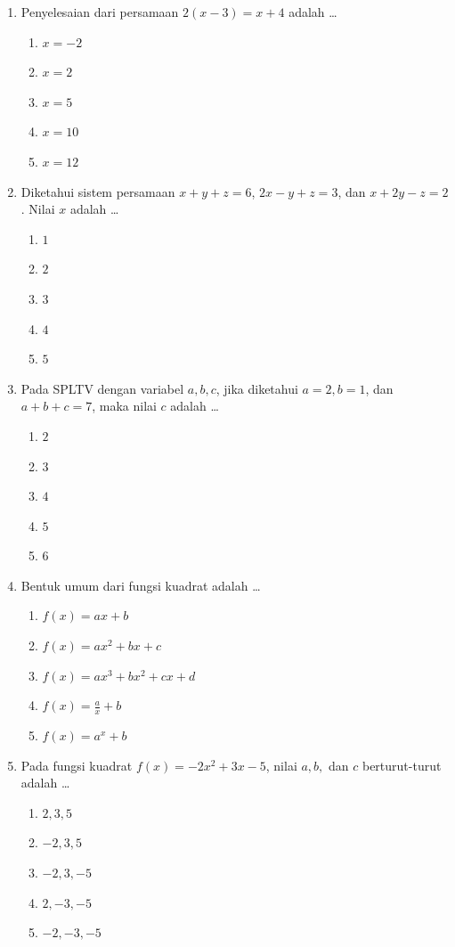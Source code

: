 \documentclass[12pt,a4paper]{article}
\begin{document}
\begin{enumerate}[leftmargin=*]
\item Penyelesaian dari persamaan $2(x - 3) = x + 4$ adalah \dots
    \begin{enumerate}[label=\alph*.]
        \item $x = -2$
        \item $x = 2$
        \item $x = 5$
        \item $x = 10$
        \item $x = 12$
    \end{enumerate}

\item Diketahui sistem persamaan $x+y+z=6$, $2x-y+z=3$, dan $x+2y-z=2$. Nilai $x$ adalah \dots
    \begin{enumerate}[label=\alph*.]
        \item $1$
        \item $2$
        \item $3$
        \item $4$
        \item $5$
    \end{enumerate}

\item Pada SPLTV dengan variabel $a, b, c$, jika diketahui $a=2, b=1$, dan $a+b+c=7$, maka nilai $c$ adalah \dots
    \begin{enumerate}[label=\alph*.]
        \item $2$
        \item $3$
        \item $4$
        \item $5$
        \item $6$
    \end{enumerate}

\item Bentuk umum dari fungsi kuadrat adalah \dots
    \begin{enumerate}[label=\alph*.]
        \item $f(x) = ax + b$
        \item $f(x) = ax^2 + bx + c$
        \item $f(x) = ax^3 + bx^2 + cx + d$
        \item $f(x) = \frac{a}{x} + b$
        \item $f(x) = a^x + b$
    \end{enumerate}

\item Pada fungsi kuadrat $f(x) = -2x^2 + 3x - 5$, nilai $a, b,$ dan $c$ berturut-turut adalah \dots
    \begin{enumerate}[label=\alph*.]
        \item $2, 3, 5$
        \item $-2, 3, 5$
        \item $-2, 3, -5$
        \item $2, -3, -5$
        \item $-2, -3, -5$
    \end{enumerate}


\end{enumerate}
\end{document}
